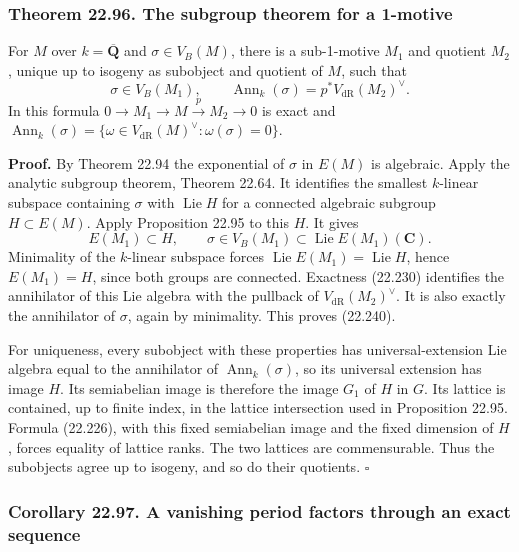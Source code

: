 \documentclass[
  11pt,
  a4paper,
]{article}
\begin{document}
\subsubsection{Theorem 22.96. The subgroup theorem for a
1-motive}\label{theorem-22.96.-the-subgroup-theorem-for-a-1-motive}

For \(M\) over \(k=\overline{\mathbf Q}\) and \(\sigma\in V_B(M)\),
there is a sub-1-motive \(M_1\) and quotient \(M_2\), unique up to
isogeny as subobject and quotient of \(M\), such that \[
 \sigma\in V_B(M_1),\qquad
 \operatorname{Ann}_k(\sigma)
   =p^*V_{\mathrm{dR}}(M_2)^\vee.
 \tag{22.240}
\] In this formula \(0\to M_1\to M\xrightarrow p M_2\to0\) is exact and
\(\operatorname{Ann}_k(\sigma)=\{\omega\in V_{\mathrm{dR}}(M)^\vee:
\omega(\sigma)=0\}\).

\textbf{Proof.} By Theorem 22.94 the exponential of \(\sigma\) in
\(E(M)\) is algebraic. Apply the analytic subgroup theorem, Theorem
22.64. It identifies the smallest \(k\)-linear subspace containing
\(\sigma\) with \(\operatorname{Lie}H\) for a connected algebraic
subgroup \(H\subset E(M)\). Apply Proposition 22.95 to this \(H\). It
gives \[
 E(M_1)\subset H,\qquad
 \sigma\in V_B(M_1)\subset\operatorname{Lie}E(M_1)(\mathbf C).
 \tag{22.241}
\] Minimality of the \(k\)-linear subspace forces
\(\operatorname{Lie}E(M_1)=\operatorname{Lie}H\), hence \(E(M_1)=H\),
since both groups are connected. Exactness (22.230) identifies the
annihilator of this Lie algebra with the pullback of
\(V_{\mathrm{dR}}(M_2)^\vee\). It is also exactly the annihilator of
\(\sigma\), again by minimality. This proves (22.240).

For uniqueness, every subobject with these properties has
universal-extension Lie algebra equal to the annihilator of
\(\operatorname{Ann}_k(\sigma)\), so its universal extension has image
\(H\). Its semiabelian image is therefore the image \(G_1\) of \(H\) in
\(G\). Its lattice is contained, up to finite index, in the lattice
intersection used in Proposition 22.95. Formula (22.226), with this
fixed semiabelian image and the fixed dimension of \(H\), forces
equality of lattice ranks. The two lattices are commensurable. Thus the
subobjects agree up to isogeny, and so do their quotients. \(\square\)

\subsubsection{Corollary 22.97. A vanishing period factors through an
exact
sequence}\label{corollary-22.97.-a-vanishing-period-factors-through-an-exact-sequence}
\end{document}
